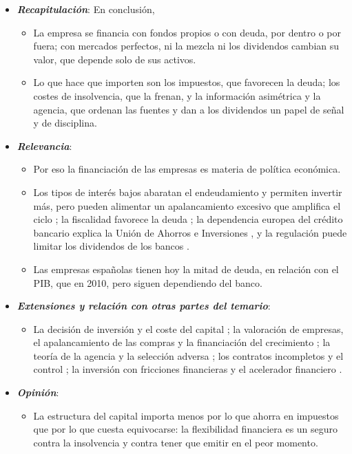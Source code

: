 \documentclass[11pt]{article}
\begin{document}
\begin{itemize}
\item \textbf{\emph{Recapitulación}}: En conclusión,
  \begin{itemize}
  \item La empresa se financia con fondos propios o con deuda, por dentro o por fuera; con mercados perfectos, ni la mezcla ni los dividendos cambian su valor, que depende solo de sus activos.

  \item Lo que hace que importen son los impuestos, que favorecen la deuda; los costes de insolvencia, que la frenan, y la información asimétrica y la agencia, que ordenan las fuentes y dan a los dividendos un papel de señal y de disciplina.
  \end{itemize}
\item \textbf{\emph{Relevancia}}:
  \begin{itemize}
  \item Por eso la financiación de las empresas es materia de política económica.

  \item Los tipos de interés bajos abaratan el endeudamiento y permiten invertir más, pero pueden alimentar un apalancamiento excesivo que amplifica el ciclo ; la fiscalidad favorece la deuda ; la dependencia europea del crédito bancario explica la Unión de Ahorros e Inversiones , y la regulación puede limitar los dividendos de los bancos .

  \item Las empresas españolas tienen hoy la mitad de deuda, en relación con el PIB, que en 2010, pero siguen dependiendo del banco.
  \end{itemize}
\item \textbf{\emph{Extensiones y relación con otras partes del temario}}:
  \begin{itemize}
  \item La decisión de inversión y el coste del capital ; la valoración de empresas, el apalancamiento de las compras y la financiación del crecimiento ; la teoría de la agencia y la selección adversa ; los contratos incompletos y el control ; la inversión con fricciones financieras y el acelerador financiero .
  \end{itemize}
\item \textbf{\emph{Opinión}}:
  \begin{itemize}
  \item La estructura del capital importa menos por lo que ahorra en impuestos que por lo que cuesta equivocarse: la flexibilidad financiera es un seguro contra la insolvencia y contra tener que emitir en el peor momento.


\end{itemize}
\end{itemize}
\end{document}
